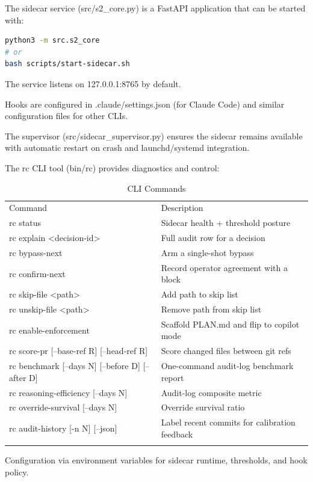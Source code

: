 
The sidecar service (src/s2_core.py) is a FastAPI application that can be started with:

\begin{lstlisting}[language=bash, caption={Starting the Sidecar}]
python3 -m src.s2_core
# or
bash scripts/start-sidecar.sh
\end{lstlisting}

The service listens on 127.0.0.1:8765 by default.


Hooks are configured in .claude/settings.json (for Claude Code) and similar configuration files for other CLIs.


The supervisor (src/sidecar_supervisor.py) ensures the sidecar remains available with automatic restart on crash and launchd/systemd integration.


The rc CLI tool (bin/rc) provides diagnostics and control:

\begin{table}[t]
    \centering
    \caption{CLI Commands}
    \label{tab:cli_commands}
    \begin{tabular}{lp{10cm}}
        \toprule
        Command & Description \\\n        \midrule
        rc status & Sidecar health + threshold posture \\\n        rc explain \textless decision-id\textgreater & Full audit row for a decision \\\n        rc bypass-next & Arm a single-shot bypass \\\n        rc confirm-next & Record operator agreement with a block \\\n        rc skip-file \textless path\textgreater & Add path to skip list \\\n        rc unskip-file \textless path\textgreater & Remove path from skip list \\\n        rc enable-enforcement & Scaffold PLAN.md and flip to copilot mode \\\n        rc score-pr [--base-ref R] [--head-ref R] & Score changed files between git refs \\\n        rc benchmark [--days N] [--before D] [--after D] & One-command audit-log benchmark report \\\n        rc reasoning-efficiency [--days N] & Audit-log composite metric \\\n        rc override-survival [--days N] & Override survival ratio \\\n        rc audit-history [-n N] [--json] & Label recent commits for calibration feedback \\\n        \bottomrule
    \end{tabular}
\end{table}


Configuration via environment variables for sidecar runtime, thresholds, and hook policy.

